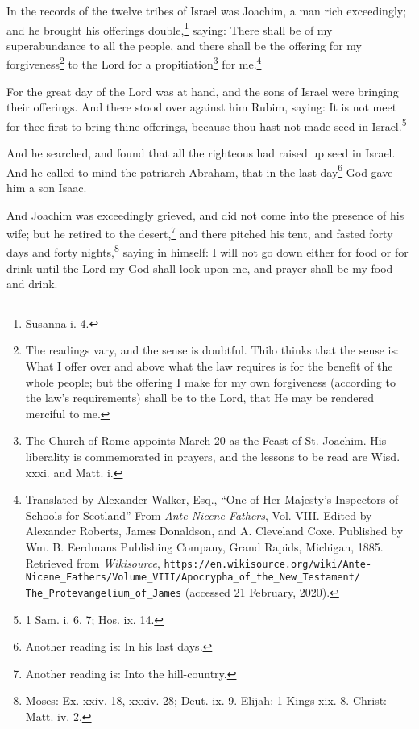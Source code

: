 \pstart
{}

\pend\setcounter{pstartR}{1}\pstart
In the records of the twelve tribes of Israel was Joachim, a man rich exceedingly; and he brought his offerings double,\footnote{Susanna i. 4.} saying: There shall be of my superabundance to all the people, and there shall be the offering for my forgiveness\footnote{The readings vary, and the sense is doubtful. Thilo thinks that the sense is: What I offer over and above what the law requires is for the benefit of the whole people; but the offering I make for my own forgiveness (according to the law's requirements) shall be to the Lord, that He may be rendered merciful to me.} to the Lord for a propitiation\footnote{The Church of Rome appoints March 20 as the Feast of St. Joachim. His liberality is commemorated in prayers, and the lessons to be read are Wisd. xxxi. and Matt. i.} for me.\footnote{Translated by Alexander Walker, Esq., ``One of Her Majesty’s Inspectors of Schools for Scotland'' From \textit{Ante-Nicene Fathers}, Vol. VIII. Edited by\\Alexander Roberts, James Donaldson, and A. Cleveland Coxe. Published by Wm. B. Eerdmans Publishing Company, Grand Rapids, Michigan, 1885.\\Retrieved from \textit{Wikisource}, \texttt{\mbox{https://en.wikisource.org/wiki/Ante-Nicene\_Fathers/Volume\_VIII/Apocrypha\_of\_the\_New\_Testament/}\\The\_Protevangelium\_of\_James} (accessed 21 February, 2020).}

\pend\pstart
For the great day of the Lord was at hand, and the sons of Israel were bringing their offerings. And there stood over against him Rubim, saying: It is not meet for thee first to bring thine offerings, because thou hast not made seed in Israel.\footnote{1 Sam. i. 6, 7; Hos. ix. 14.}

\pend\pstart
And he searched, and found that all the righteous had raised up seed in Israel. And he called to mind the patriarch Abraham, that in the last day\footnote{Another reading is: In his last days.} God gave him a son Isaac.

\pend\pstart
And Joachim was exceedingly grieved, and did not come into the presence of his wife; but he retired to the desert,\footnote{Another reading is: Into the hill-country.} and there pitched his tent, and fasted forty days and forty nights,\footnote{Moses: Ex. xxiv. 18, xxxiv. 28; Deut. ix. 9. Elijah: 1 Kings xix. 8. Christ: Matt. iv. 2.} saying in himself: I will not go down either for food or for drink until the Lord my God shall look upon me, and prayer shall be my food and drink.

